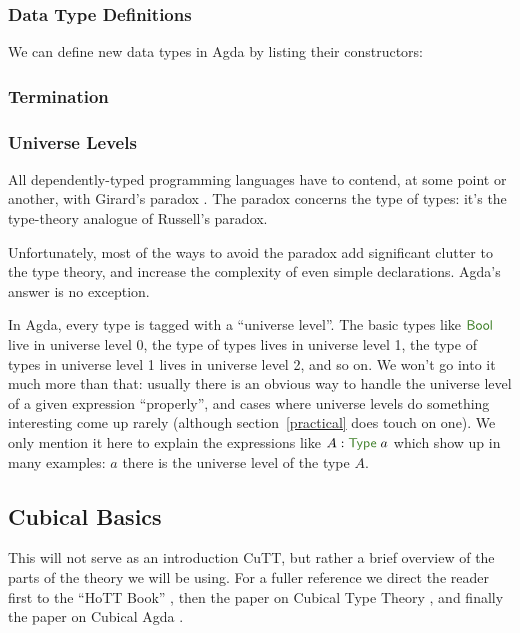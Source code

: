 \begin{refsection}
\begin{subappendices}
\subsubsection{Data Type Definitions}
We can define new data types in Agda by listing their constructors:
\subsubsection{Termination}
\subsubsection{Universe Levels}
All dependently-typed programming languages have to contend, at some point or
another, with Girard's paradox
\cite{girardInterpretationFonctionelleElimination1972}.
The paradox concerns the type of types: it's the type-theory analogue of
Russell's paradox.

Unfortunately, most of the ways to avoid the paradox add significant clutter to
the type theory, and increase the complexity of even simple declarations.
Agda's answer is no exception.

In Agda, every type is tagged with a ``universe level''.
The basic types like \(\AgdaDatatype{Bool}\) live in universe level 0, the type
of types lives in universe level 1, the type of types in universe level 1 lives
in universe level 2, and so on.
We won't go into it much more than that: usually there is an obvious way to
handle the universe level of a given expression ``properly'', and cases where
universe levels do something interesting come up rarely (although
section~\ref{practical} does touch on one).
We only mention it here to explain the expressions like \(A :
\AgdaDatatype{Type} \; a\) which show up in many examples: \(a\) there is the
universe level of the type \(A\).
\subsection{Cubical Basics}
This will not serve as an introduction CuTT,
but rather a brief overview of the parts of the theory we will be using.
For a fuller reference we direct the reader first to the ``HoTT Book''
\cite{hottbook}, then the paper on Cubical Type Theory
\cite{cohenCubicalTypeTheory2016}, and finally the paper on Cubical Agda
\cite{vezzosiCubicalAgdaDependently2019}.

\end{subappendices}
\end{refsection}
